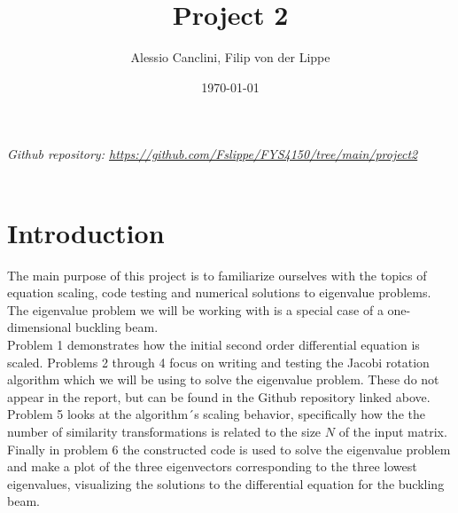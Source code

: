 \documentclass[english,notitlepage]{revtex4-1}  %
\begin{document}
\title{Project 2}
\author{Alessio Canclini, Filip von der Lippe}
\date{\today}
\noaffiliation                            %


\maketitle

\textit{Github repository: \url{https://github.com/Fslippe/FYS4150/tree/main/project2}}
\\
\\
\section*{Introduction}
The main purpose of this project is to familiarize ourselves with the topics
of equation scaling, code testing and numerical solutions to eigenvalue problems. 
The eigenvalue problem we will be working with is a special case of a 
one-dimensional buckling beam. \\
Problem 1 demonstrates how the initial second order differential equation
is scaled. Problems 2 through 4 focus on writing and testing the Jacobi rotation algorithm which we 
will be using to solve the eigenvalue problem. These do not appear in the report, 
but can be found in the Github repository linked above. Problem 5 looks at the 
algorithm´s scaling behavior, specifically how the the number of similarity transformations 
is related to the size $N$ of the input matrix. Finally in problem 6 the constructed code is used 
to solve the eigenvalue problem and make a plot of the three eigenvectors corresponding to the 
three lowest eigenvalues, visualizing the solutions to the differential equation for the buckling beam. \\
\\
\\
\end{document}
